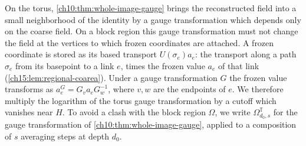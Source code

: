 On the torus, \cref{ch10:thm:whole-image-gauge} brings the reconstructed field into a small neighborhood of the identity by a gauge transformation which depends only on the coarse field. On a block region this gauge transformation must not change the field at the vertices to which frozen coordinates are attached. A frozen coordinate is stored as its based transport $U(\sigma_e)a_e$: the transport along a path $\sigma_e$ from its basepoint to a link $e$, times the frozen value $a_e$ of that link (\cref{ch15:lem:regional-coarea}). Under a gauge transformation $G$ the frozen value transforms as $a_e^G=G_va_eG_w^{-1}$, where $v,w$ are the endpoints of $e$. We therefore multiply the logarithm of the torus gauge transformation by a cutoff which vanishes near $H$. To avoid a clash with the block region $\Omega$, we write $\Omega^{\mathbb T}_{d_0,s}$ for the gauge transformation of \cref{ch10:thm:whole-image-gauge}, applied to a composition of $s$ averaging steps at depth $d_0$.

